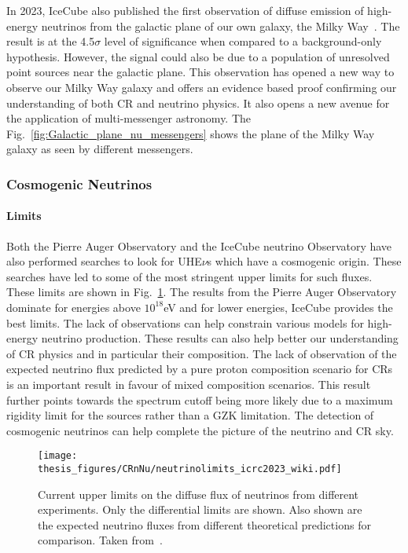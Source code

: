   In 2023, IceCube also published the first observation of diffuse emission of high-energy neutrinos from the galactic plane of our own galaxy, the Milky Way~\cite{Galactic_plane_nu_2023}. The result is at the 4.5$\sigma$ level of significance when compared to a background-only hypothesis. However, the signal could also be due to a population of unresolved point sources near the galactic plane. This observation has opened a new way to observe our Milky Way galaxy and offers an evidence based proof confirming our understanding of both \gls{CR} and neutrino physics. It also opens a new avenue for the application of multi-messenger astronomy. The Fig.~\ref{fig:Galactic_plane_nu_messengers} shows the plane of the Milky Way galaxy as seen by different messengers.
  
\subsubsection*{Cosmogenic Neutrinos}

  \paragraph{Limits}
  \label{subsubsec:CosmoNuLimits}
  Both the Pierre Auger Observatory and the IceCube neutrino Observatory have also performed searches to look for UHE$\nu$s which have a cosmogenic origin. These searches have led to some of the most stringent upper limits for such fluxes. These limits are shown in Fig.~\ref{fig:Nu_limits_auger}. The results from the Pierre Auger Observatory dominate for energies above $10^{18}$eV and for lower energies, IceCube provides the best limits. The lack of observations can help constrain various models for high-energy neutrino production. These results can also help better our understanding of \gls{CR} physics and in particular their composition. The lack of observation of the expected neutrino flux predicted by a pure proton composition scenario for \glspl{CR} is an important result in favour of mixed composition scenarios. This result further points towards the spectrum cutoff being more likely due to a maximum rigidity limit for the sources rather than a GZK limitation. The detection of cosmogenic neutrinos can help complete the picture of the neutrino and \gls{CR} sky. 

\begin{figure}[t!]
  \centering
  \texttt{[image: thesis\_figures/CRnNu/neutrinolimits\_icrc2023\_wiki.pdf]}
  \caption{Current upper limits on the diffuse flux of neutrinos from different experiments. Only the differential limits are shown. Also shown are the expected neutrino fluxes from different theoretical predictions for comparison. Taken from~\cite{PierreAuger:2023pjg}.}
  \label{fig:Nu_limits_auger}
\end{figure}

